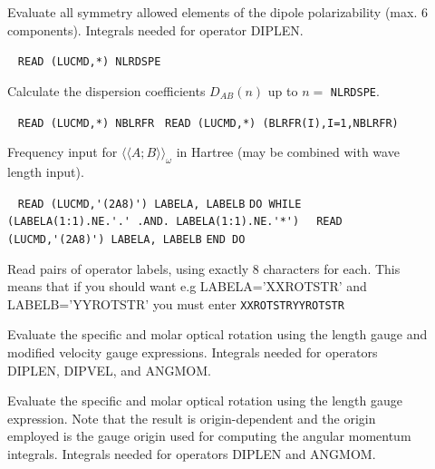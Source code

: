 \begin{description}
\item[] 
Evaluate all symmetry allowed elements of the dipole polarizability
(max. 6 components).
Integrals needed for operator DIPLEN.

\item[] \verb| |\newline
   \verb|READ (LUCMD,*) NLRDSPE|

   Calculate the dispersion coefficients 
   $D_{AB}(n)$ up to $n = $ \verb+NLRDSPE+.

\item[] \verb| |\newline
   \verb|READ (LUCMD,*) NBLRFR |\newline
   \verb|READ (LUCMD,*) (BLRFR(I),I=1,NBLRFR)|

Frequency input for $\langle\langle A;B \rangle\rangle_{\omega}$ in
Hartree (may be combined with wave length input).

%
%
%
\item[] \verb| |\newline
   \verb|READ (LUCMD,'(2A8)') LABELA, LABELB|\newline
   \verb|DO WHILE (LABELA(1:1).NE.'.' .AND. LABELA(1:1).NE.'*')|\newline
   \verb|  READ (LUCMD,'(2A8)') LABELA, LABELB|\newline
   \verb|END DO|

Read pairs of operator labels, using exactly 8 characters for each. 
This means that if you should want e.g LABELA='XXROTSTR' and LABELB='YYROTSTR'
you must enter\newline
\verb|XXROTSTRYYROTSTR|


\item[] 
Evaluate the specific and molar optical rotation using the length gauge
and modified velocity gauge
expressions.
Integrals needed for operators DIPLEN, DIPVEL, and ANGMOM.

\item[] 
Evaluate the specific and molar optical rotation using the length gauge
expression. Note that the result is origin-dependent and the origin employed
is the gauge origin used for computing the angular momentum integrals.
Integrals needed for operators DIPLEN and ANGMOM.


\end{description}
